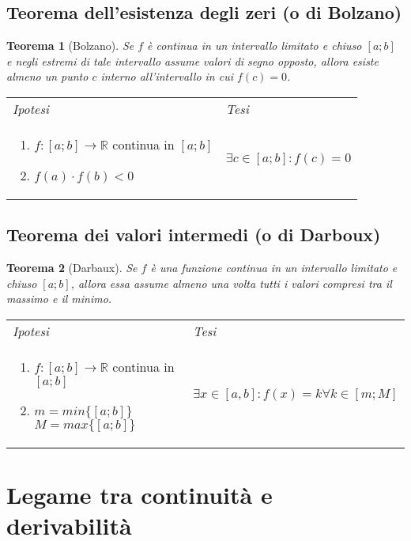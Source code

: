 \documentclass{article}     %
\newcommand\R{\mathbb{R}}
\newtheorem*{theorem}{Teorema}
\newenvironment{shadedTheorem}%
  {\begin{mdframed}[backgroundcolor=lightgray!40, linecolor=white, innertopmargin=4pt, innerbottommargin=13pt]\begin{theorem}}%
  {\end{theorem}\end{mdframed}}
\begin{document}
    \subsection{Teorema dell'esistenza degli zeri (o di Bolzano)}
        \begin{shadedTheorem}[Bolzano]
            Se $f$ è continua in un intervallo limitato e chiuso $[a;b]$ e negli estremi di tale intervallo assume valori di segno opposto, allora esiste almeno un punto $c$ interno all'intervallo in cui $f(c)=0$.
        \end{shadedTheorem}
        \begin{tabular}{m{}m{}}
            \textit{Ipotesi} & \textit{Tesi}  \\
            \begin{enumerate}
                \item $f: [a;b] \to \R$ continua in $[a;b]$
                \item $f(a) \cdot f(b)<0$
            \end{enumerate} & $\exists c \in [a;b]:f(c)=0$ 
        \end{tabular}
    
    \subsection{Teorema dei valori intermedi (o di Darboux)}
        \begin{shadedTheorem}[Darbaux]
            Se $f$ è una funzione continua in un intervallo limitato e chiuso $[a;b]$, allora essa assume almeno una volta tutti i valori compresi tra il massimo e il minimo.
        \end{shadedTheorem}
        \begin{tabular}{m{}m{}}
            \textit{Ipotesi} & \textit{Tesi}  \\
            \begin{enumerate}
                \item $f: [a;b]\to \R$ continua in $[a;b]$
                \item $m=min\{[a;b]\}$ ~~~ $M=max\{[a;b]\}$
            \end{enumerate} & $\exists x \in [a,b] : f(x)=k \forall k \in [m;M]$
        \end{tabular}
    
\section{Legame tra continuità e derivabilità}
\end{document}
